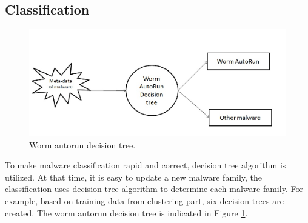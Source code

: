 \subsection{Classification}
\begin{figure}[h!]
\centering
\includegraphics[width=1\textwidth]{graph/classificationdecision.jpg}
\caption{Worm autorun decision tree.}
\label{fig:classificationdecision}
\end{figure}

To make malware classification rapid and correct, decision tree algorithm is utilized. At that time, it is easy to update a new malware family, the classification uses decision tree algorithm to determine each malware family. For example, based on training data from clustering part, six decision trees are created. The worm autorun decision tree is indicated in Figure \ref{fig:classificationdecision}.

